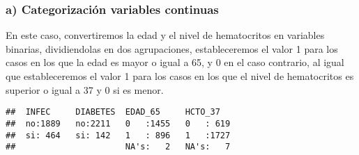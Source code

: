 \documentclass[]{article}
\newenvironment{Shaded}{\begin{snugshade}}{\end{snugshade}}
\newcommand{\DecValTok}[1]{\textcolor[rgb]{0.00,0.00,0.81}{#1}}
\newcommand{\KeywordTok}[1]{\textcolor[rgb]{0.13,0.29,0.53}{\textbf{#1}}}
\newcommand{\NormalTok}[1]{#1}
\newcommand{\OperatorTok}[1]{\textcolor[rgb]{0.81,0.36,0.00}{\textbf{#1}}}
\newcommand{\StringTok}[1]{\textcolor[rgb]{0.31,0.60,0.02}{#1}}
\begin{document}
\hypertarget{a-categorizaciuxf3n-variables-continuas}{%
\subsubsection{a) Categorización variables
continuas}\label{a-categorizaciuxf3n-variables-continuas}}

En este caso, convertiremos la edad y el nivel de hematocritos en
variables binarias, dividiendolas en dos agrupaciones, estableceremos el
valor 1 para los casos en los que la edad es mayor o igual a 65, y 0 en
el caso contrario, al igual que estableceremos el valor 1 para los casos
en los que el nivel de hematocritos es superior o igual a 37 y 0 si es
menor.

\begin{Shaded}
\end{Shaded}

\begin{verbatim}
##  INFEC     DIABETES  EDAD_65     HCTO_37    
##  no:1889   no:2211   0   :1455   0   : 619  
##  si: 464   si: 142   1   : 896   1   :1727  
##                      NA's:   2   NA's:   7
\end{verbatim}
\end{document}

